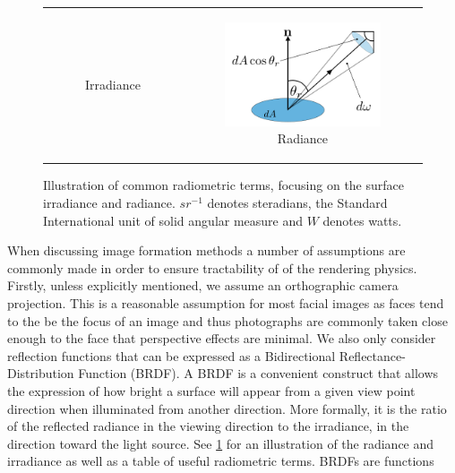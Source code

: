 \begin{figure}[t]
\begin{tabular}{cc}
\begin{subfigure}[b]{0.48\textwidth}
			\caption*{Irradiance}
		\end{subfigure} &
		\begin{subfigure}[b]{0.48\textwidth}
			\centering
			\includegraphics[width=\textwidth]{background/images/radiance}
			\caption*{Radiance}
		\end{subfigure}
	\end{tabular}
	\caption{Illustration of common radiometric terms, focusing on the surface
	         irradiance and radiance. ${sr}^{-1}$ denotes steradians, the
	         Standard International unit of solid angular measure and
	         $W$ denotes watts.}
\label{fig:bg_sfs_rad_irrad}
\end{figure}
When discussing image formation methods a number of assumptions are commonly
made in order to ensure tractability of of the rendering physics. Firstly,
unless explicitly mentioned, we assume an orthographic camera projection. This
is a reasonable assumption for most facial images as faces tend to the be
the focus of an image and thus photographs are commonly taken close enough
to the face that perspective effects are minimal. We also only consider
reflection functions that can be expressed as a Bidirectional
Reflectance-Distribution Function (BRDF). A BRDF is a convenient construct
that allows the expression of how bright a surface will appear from a given
view point direction when illuminated from another direction. More formally, it
is the ratio of the reflected radiance in the viewing direction to the
irradiance, in the direction toward the light source.
See \cref{fig:bg_sfs_rad_irrad} for an illustration of the radiance and
irradiance as well as a table of useful radiometric terms. BRDFs are functions
